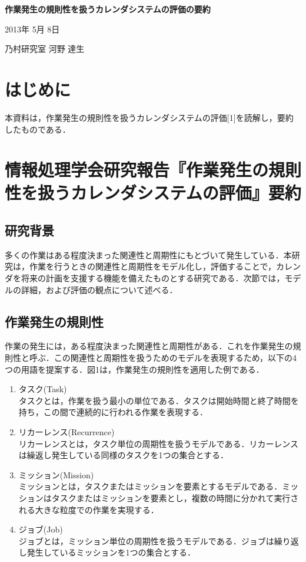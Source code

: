\documentclass[fleqn, 14pt]{extarticlej}
\begin{document}
\begin{center}
{\Large {\bf 作業発生の規則性を扱うカレンダシステムの評価の要約}}

\end{center}
\begin{flushright}
2013年 5月 8日

乃村研究室 河野 達生
\end{flushright}

\section{はじめに}
本資料は，作業発生の規則性を扱うカレンダシステムの評価[1]を読解し，要約したものである．

\section{情報処理学会研究報告『作業発生の規則性を扱うカレンダシステムの評価』要約}

\subsection{研究背景}
多くの作業はある程度決まった関連性と周期性にもとづいて発生している．本研究は，作業を行うときの関連性と周期性をモデル化し，評価することで，カレンダを将来の計画を支援する機能を備えたものとする研究である．次節では，モデルの詳細，および評価の観点について述べる．

\subsection{作業発生の規則性}
作業の発生には，ある程度決まった関連性と周期性がある．これを作業発生の規則性と呼ぶ．この関連性と周期性を扱うためのモデルを表現するため，以下の4つの用語を提案する．図1は，作業発生の規則性を適用した例である．
   \begin{enumerate}   		
	\item タスク(Task)\\
		タスクとは，作業を扱う最小の単位である．タスクは開始時間と終了時間を持ち，この間で連続的に行われる作業を表現する．
	\item リカーレンス(Recurrence)\\
		リカーレンスとは，タスク単位の周期性を扱うモデルである．リカーレンスは繰返し発生している同様のタスクを1つの集合とする．
	\item ミッション(Mission)\\
		ミッションとは，タスクまたはミッションを要素とするモデルである．ミッションはタスクまたはミッションを要素とし，複数の時間に分かれて実行される大きな粒度での作業を実現する．
	\item ジョブ(Job)\\
		ジョブとは，ミッション単位の周期性を扱うモデルである．ジョブは繰り返し発生しているミッションを1つの集合とする．
	\end{enumerate}
\end{document}

